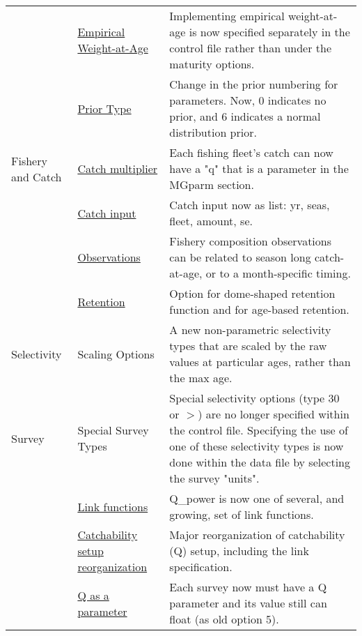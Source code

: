\begin{center}
{\begin{longtable}{p{2cm} p{3cm} p{10cm}}
		  & \hyperlink{WAAparm} {Empirical Weight-at-Age} & Implementing empirical weight-at-age is now specified separately in the control file rather than under the maturity options.\\

		  & \hyperlink{Priors}{Prior Type} & Change in the prior numbering for parameters.  Now, 0 indicates no prior, and 6 indicates a normal distribution prior.\\

		Fishery and Catch & 
			\hyperlink{CatchMult}{Catch multiplier} & 
				Each fishing fleet's catch can now have a "q" that is a parameter in the MGparm section.\\
				
			& \hyperlink{CatchFormat}{Catch input} & 
				Catch input now as list:  yr, seas, fleet, amount, se. \\
				
			& \hyperlink{CompTiming}{Observations} & 
				Fishery composition observations can be related to season long catch-at-age, or to a month-specific timing.\\
		
			& \hyperlink{DomeRetention}{Retention} & 
				Option for dome-shaped retention function and for age-based retention. \\

		Selectivity 
			& Scaling Options & 	
				A new non-parametric selectivity types that are scaled by the raw values at particular ages, rather than the max age.\\

		Survey
			& Special Survey Types & 
				Special selectivity options (type 30 or $>$) are no longer specified within the control file.  Specifying the use of one of these selectivity types is now done within the data file by selecting the survey "units". \\  

			& \hyperlink{Qsetup}{Link functions} & 
				Q\_power is now one of several, and growing, set of link functions. \\
				
			& \hyperlink{Qsetup}{Catchability setup reorganization} & 
				Major reorganization of catchability (Q) setup, including the link specification. \\
			
			& \multicolumn{1}{l}{\hyperlink{Qsetup}{Q as a parameter}} & 
				Each survey now must have a Q parameter and its value still can float (as old option 5).\\


\end{longtable}}
\end{center}
